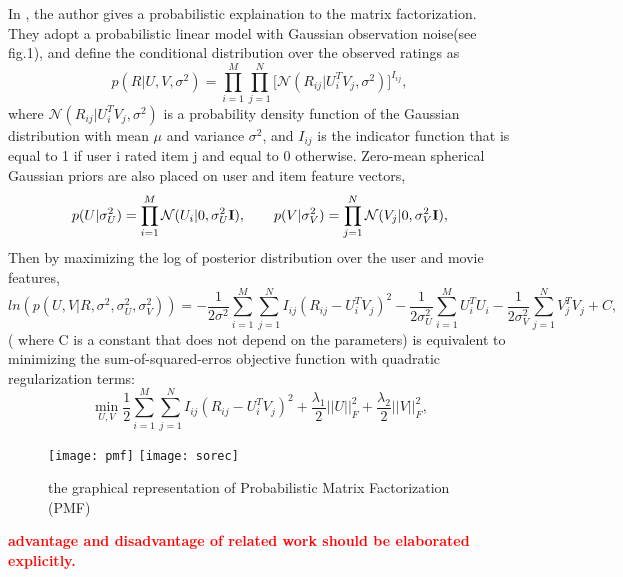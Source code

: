 In \cite{mnih2007probabilistic}, the author gives a probabilistic explaination to the matrix factorization. They adopt a probabilistic linear model with Gaussian observation noise(see fig.1), and define the conditional distribution over the observed ratings as
\begin{equation}
p(R|U,V,\sigma^2) = \prod_{i=1}^{M}\prod_{j=1}^{N}\big[\mathcal{N}(R_{ij}|U_i^TV_j,\sigma^2)\big]^{I_{ij}},
\end{equation} 
where $\mathcal{N}(R_{ij}|U_i^TV_j,\sigma^2)$ is a probability density function of the Gaussian distribution with mean $\mu$ and variance $\sigma^2$, and $I_{ij}$ is the indicator function that is equal to 1 if user i rated item j and equal to 0 otherwise. Zero-mean spherical Gaussian priors are also placed on user and item feature vectors, 
\begin{equation}
p(U|\sigma_U^2) = \prod_{i=1}^{M}\mathcal{N}(U_{i}|0,\sigma_U^2\bold{I}),\quad\quad
p(V|\sigma_V^2) = \prod_{j=1}^{N}\mathcal{N}(V_{j}|0,\sigma_V^2\bold{I}),
\end{equation} 
Then by maximizing the log of posterior distribution over the user and movie features,
\begin{equation}
ln(p(U,V|R, \sigma^2,\sigma_U^2,\sigma_V^2)) = -\frac{1}{2\sigma^2}\sum_{i=1}^{M}\sum_{j=1}^{N}I_{ij}(R_{ij} - U_i^TV_j)^2 - \frac{1}{2\sigma_U^2}\sum_{i=1}^{M}U_i^TU_i - \frac{1}{2\sigma_V^2}\sum_{j=1}^{N}V_j^TV_j + C,
\end{equation} 
( where C is a constant that does not depend on the parameters) is equivalent to minimizing the sum-of-squared-erros objective function with quadratic regularization terms:
\begin{equation}
\min_{U,V}\frac{1}{2}\sum_{i=1}^{M}\sum_{j=1}^{N}I_{ij}(R_{ij} - U_i^TV_j)^2 + \frac{\lambda_1}{2}||U||_F^2 + \frac{\lambda_2}{2}||V||_F^2,
\end{equation} 
\begin{figure}[h]
	\caption{the graphical representation of Probabilistic Matrix Factorization (PMF)}
	\centering
	\texttt{[image: pmf]}
	\texttt{[image: sorec]}
\end{figure}

\textcolor{red}{\textbf{advantage and disadvantage of related work should be elaborated explicitly.}}

